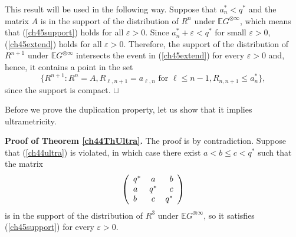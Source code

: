 \documentclass[12pt]{article}
\newcommand{\eps}{{\varepsilon}}
\newcommand{\e}{\mathbb{E}}
\newcommand\qed{\hfill\hbox{\rlap{$\sqcap$}$\sqcup$}}
\theoremstyle{nonumberplain}
\begin{document}
This result will be used in the following way. Suppose that $a_n^*<q^*$ and the matrix $A$ is in the support of the distribution of $R^n$ under $\e G^{\otimes \infty}$, which means that (\ref{ch45support}) holds for all $\eps>0$. Since $a_n^*+\eps<q^*$ for small $\eps>0$,  (\ref{ch45extend}) holds for all $\eps>0$. Therefore, the support of the distribution of $R^{n+1}$ under $\e G^{\otimes \infty}$ intersects the event in (\ref{ch45extend}) for every $\eps>0$ and, hence, it contains a point in the set
\begin{equation}
\bigl\{
R^{n+1} :
R^n = A, R_{\ell,n+1} = a_{\ell,n} \mbox{ for }\ell\leq n-1, R_{n,n+1} \leq a_n^*
\bigr\},
\label{ch45Aplus}
\end{equation}
since the support is compact.
\qed

\medskip
Before we prove the duplication property, let us show that it implies ultrametricity.

\medskip
\noindent\textbf{Proof of Theorem \ref{ch44ThUltra}.}
The proof is by contradiction. Suppose that (\ref{ch44ultra}) is violated, in which case there exist $a<b\leq c <q^*$ such that the matrix
\begin{equation}
\left(
\begin{array}{ l c r }
  q^* & a & b \\
  a & q^* & c \\
  b &  c & q^* \\
\end{array}
\right)
\label{ch45violated}
\end{equation}
is in the support of the distribution of $R^3$ under $\e G^{\otimes \infty}$, so it satisfies (\ref{ch45support}) for every $\eps>0$. 
\end{document}
